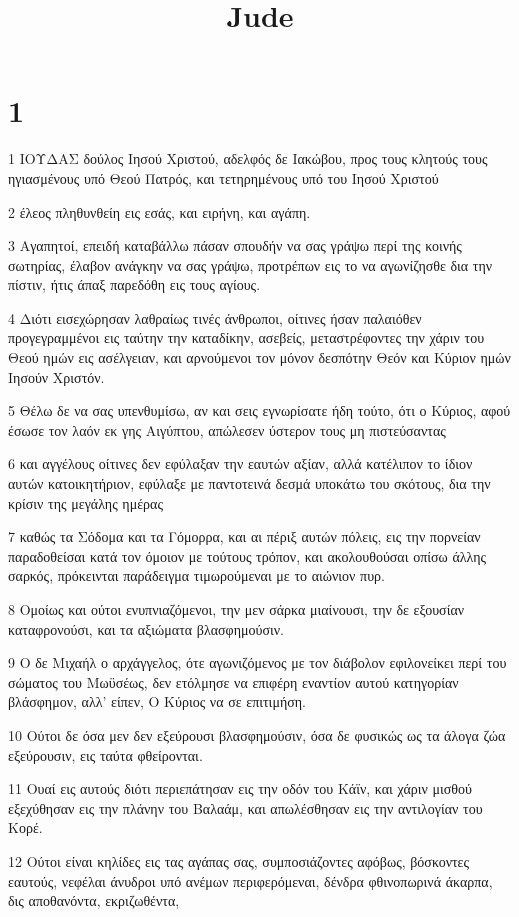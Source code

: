 

\title{Jude}


\chapter{1}

\par 1 ΙΟΥΔΑΣ δούλος Ιησού Χριστού, αδελφός δε Ιακώβου, προς τους κλητούς τους ηγιασμένους υπό Θεού Πατρός, και τετηρημένους υπό του Ιησού Χριστού
\par 2 έλεος πληθυνθείη εις εσάς, και ειρήνη, και αγάπη.
\par 3 Αγαπητοί, επειδή καταβάλλω πάσαν σπουδήν να σας γράψω περί της κοινής σωτηρίας, έλαβον ανάγκην να σας γράψω, προτρέπων εις το να αγωνίζησθε δια την πίστιν, ήτις άπαξ παρεδόθη εις τους αγίους.
\par 4 Διότι εισεχώρησαν λαθραίως τινές άνθρωποι, οίτινες ήσαν παλαιόθεν προγεγραμμένοι εις ταύτην την καταδίκην, ασεβείς, μεταστρέφοντες την χάριν του Θεού ημών εις ασέλγειαν, και αρνούμενοι τον μόνον δεσπότην Θεόν και Κύριον ημών Ιησούν Χριστόν.
\par 5 Θέλω δε να σας υπενθυμίσω, αν και σεις εγνωρίσατε ήδη τούτο, ότι ο Κύριος, αφού έσωσε τον λαόν εκ γης Αιγύπτου, απώλεσεν ύστερον τους μη πιστεύσαντας
\par 6 και αγγέλους οίτινες δεν εφύλαξαν την εαυτών αξίαν, αλλά κατέλιπον το ίδιον αυτών κατοικητήριον, εφύλαξε με παντοτεινά δεσμά υποκάτω του σκότους, δια την κρίσιν της μεγάλης ημέρας
\par 7 καθώς τα Σόδομα και τα Γόμορρα, και αι πέριξ αυτών πόλεις, εις την πορνείαν παραδοθείσαι κατά τον όμοιον με τούτους τρόπον, και ακολουθούσαι οπίσω άλλης σαρκός, πρόκεινται παράδειγμα τιμωρούμεναι με το αιώνιον πυρ.
\par 8 Ομοίως και ούτοι ενυπνιαζόμενοι, την μεν σάρκα μιαίνουσι, την δε εξουσίαν καταφρονούσι, και τα αξιώματα βλασφημούσιν.
\par 9 Ο δε Μιχαήλ ο αρχάγγελος, ότε αγωνιζόμενος με τον διάβολον εφιλονείκει περί του σώματος του Μωϋσέως, δεν ετόλμησε να επιφέρη εναντίον αυτού κατηγορίαν βλάσφημον, αλλ' είπεν, Ο Κύριος να σε επιτιμήση.
\par 10 Ούτοι δε όσα μεν δεν εξεύρουσι βλασφημούσιν, όσα δε φυσικώς ως τα άλογα ζώα εξεύρουσιν, εις ταύτα φθείρονται.
\par 11 Ουαί εις αυτούς διότι περιεπάτησαν εις την οδόν του Κάϊν, και χάριν μισθού εξεχύθησαν εις την πλάνην του Βαλαάμ, και απωλέσθησαν εις την αντιλογίαν του Κορέ.
\par 12 Ούτοι είναι κηλίδες εις τας αγάπας σας, συμποσιάζοντες αφόβως, βόσκοντες εαυτούς, νεφέλαι άνυδροι υπό ανέμων περιφερόμεναι, δένδρα φθινοπωρινά άκαρπα, δις αποθανόντα, εκριζωθέντα,

